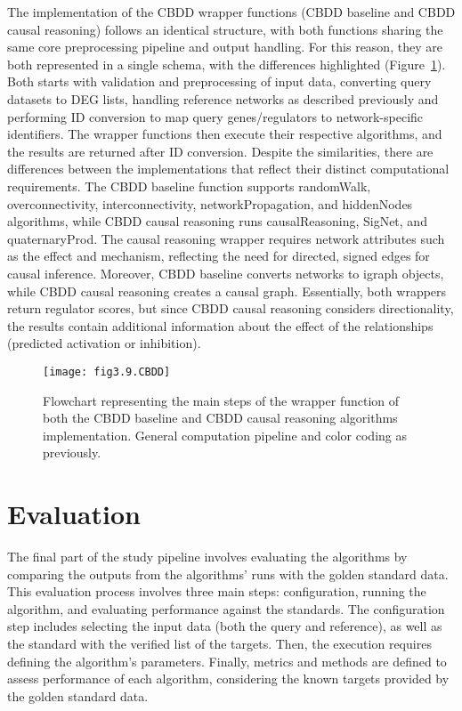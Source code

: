 The implementation of the \gls{CBDD} wrapper functions (CBDD baseline and CBDD causal reasoning) follows an identical structure, with both functions sharing the same core preprocessing pipeline and output handling. For this reason, they are both represented in a single schema, with the differences highlighted (Figure~\ref{fig:fig3.9.CBDD}). Both starts with validation and preprocessing of input data, converting query datasets to DEG lists, handling reference networks as described previously and performing ID conversion to map query genes/regulators to network-specific identifiers. The wrapper functions then execute their respective algorithms, and the results are returned after ID conversion. Despite the similarities, there are differences between the implementations that reflect their distinct computational requirements. The CBDD baseline function supports randomWalk, overconnectivity, interconnectivity, networkPropagation, and hiddenNodes algorithms, while CBDD causal reasoning runs causalReasoning, SigNet, and quaternaryProd. The causal reasoning wrapper requires network attributes such as the effect and mechanism, reflecting the need for directed, signed edges for causal inference. Moreover, CBDD baseline converts networks to igraph objects, while CBDD causal reasoning creates a causal graph. Essentially, both wrappers return regulator scores, but since CBDD causal reasoning considers directionality, the results contain additional information about the effect of the relationships (predicted activation or inhibition).

\begin{figure}[htbp]
    \centering
    \texttt{[image: fig3.9.CBDD]}
    \caption{Flowchart representing the main steps of the wrapper function of both the CBDD baseline and CBDD causal reasoning algorithms implementation. General computation pipeline and color coding as previously.}
    \label{fig:fig3.9.CBDD}
\end{figure}


\section{Evaluation} %
\label{sec:evaluation}


The final part of the study pipeline involves evaluating the algorithms by comparing the outputs from the algorithms' runs with the golden standard data. This evaluation process involves three main steps: configuration, running the algorithm, and evaluating performance against the standards. The configuration step includes selecting the input data (both the query and reference), as well as the standard with the verified list of the targets. Then, the execution requires defining the algorithm's parameters. Finally, metrics and methods are defined to assess performance of each algorithm, considering the known targets provided by the golden standard data. 

